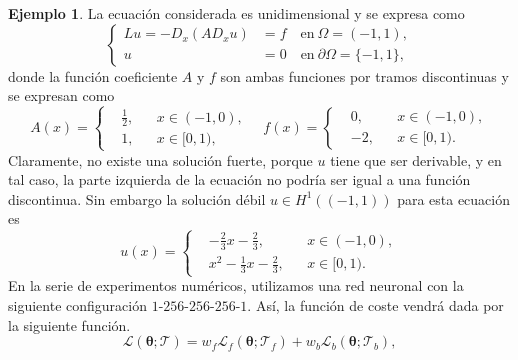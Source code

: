 \documentclass[a4paper,11pt,spanish, twoside, leqno]{tfg-uam}
\theoremstyle{definition}
\newtheorem{exmp}[teor]{Ejemplo}
\begin{document}
\begin{mdframed}
    \begin{exmp}
        La ecuación considerada es unidimensional y se expresa como
        \begin{equation}
            \left\{
            \begin{aligned}
                L u =-D_{x}(AD_{x} u) &=f\quad \text{en}\  \Omega=(-1,1), \\
                u &=0\quad \text{en}\  \partial\Omega=\{-1,1\},
            \end{aligned}
            \right.
        \end{equation}
        donde la función coeficiente $A$ y $f$ son ambas funciones por tramos discontinuas y se expresan como
        \begin{equation}\label{eq:1dCoeff}
            A(x)=\left\{
            \begin{aligned}
                & \tfrac{1}{2}, & & x\in (-1,0), \\
                &1, & & x\in [0,1),
            \end{aligned}
            \right.\quad 
            f(x)=\left\{
            \begin{aligned}
                & 0, & & x\in (-1,0), \\
                & -2, & & x\in [0,1).
            \end{aligned}
            \right.
        \end{equation}
        Claramente, no existe una solución fuerte, porque $u$ tiene que ser derivable, y en tal caso, la parte izquierda de la ecuación no podría ser igual a una función discontinua. Sin embargo la solución débil $u\in H^1((-1,1))$ para esta ecuación es
        \begin{equation}\label{eq:SolTo1dEq}
            u(x)=
            \left\{
            \begin{aligned}
                & -\tfrac{2}{3}x-\tfrac{2}{3}, & & x\in (-1,0), \\
                & x^2-\tfrac{1}{3}x-\tfrac{2}{3}, & & x\in [0,1).
            \end{aligned}
            \right.
        \end{equation}
        En la serie de experimentos numéricos, utilizamos una red neuronal con la siguiente configuración $1$-$256$-$256$-$256$-$1$.  Así, la función de coste vendrá dada por la siguiente función.
        \begin{equation*} 
            \mathcal{L}(\boldsymbol{\theta}; \mathcal{T}) = w_f \mathcal{L}_f(\boldsymbol{\theta}; \mathcal{T}_f) + w_b \mathcal{L}_b(\boldsymbol{\theta}; \mathcal{T}_b),

\end{equation*}
\end{exmp}
\end{mdframed}
\end{document}
